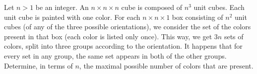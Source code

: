 Let $n > 1$ be an integer. An $n \times n \times n$ cube is composed of $n^3$ unit cubes. Each unit cube is painted with one color. For each $n \times n \times 1$ box consisting of $n^2$ unit cubes (of any of the three possible orientations), we consider the set of the colors present in that box (each color is listed only once). This way, we get $3n$ sets of colors, split into three groups according to the orientation. It happens that for every set in any group, the same set appears in both of the other groups. Determine, in terms of $n$, the maximal possible number of colors that are present.
